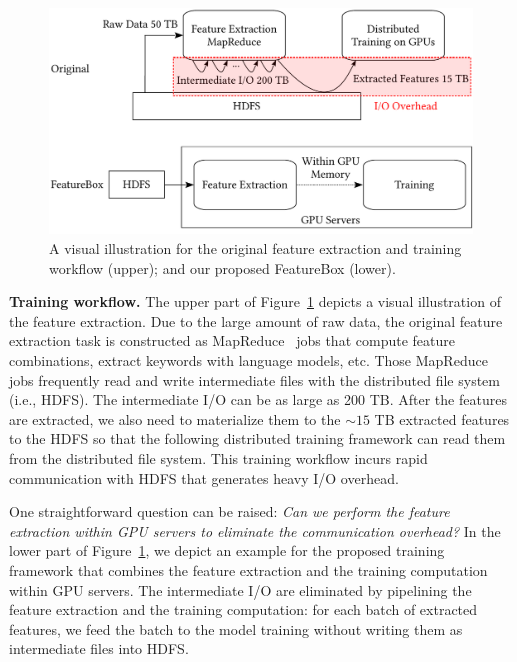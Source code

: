 \documentclass[conference]{IEEEtran}
\begin{document}



\begin{figure}[htbp]
\includegraphics[width=.5\textwidth]{figs/feabox.pdf}
\caption{A visual illustration for the original feature extraction and training workflow (upper); and our proposed FeatureBox (lower).}\label{fig:feabox}
\end{figure}

\textbf{Training workflow.} 
The upper part of Figure~\ref{fig:feabox} depicts a visual illustration of the feature extraction. Due to the large amount of raw data, the original feature extraction task is constructed as MapReduce~\cite{???} jobs that compute feature combinations, extract keywords with language models, etc. Those MapReduce jobs frequently read and write intermediate files with the distributed file system (i.e., HDFS). The intermediate I/O can be as large as 200 TB. After the features are extracted, we also need to materialize them to the $\sim 15$ TB extracted features to the HDFS so that the following distributed training framework can read them from the distributed file system. 
This training workflow incurs rapid communication with HDFS that generates heavy I/O overhead. 

One straightforward question can be raised: \textit{Can we perform the feature extraction within GPU servers to eliminate the communication overhead?} 
In the lower part of Figure~\ref{fig:feabox}, we depict an example for the proposed training framework that combines the feature extraction and the training computation within GPU servers. The intermediate I/O are eliminated by pipelining the feature extraction and the training computation: for each batch of extracted features, we feed the batch to the model training without writing them as intermediate files into HDFS.
\end{document}
